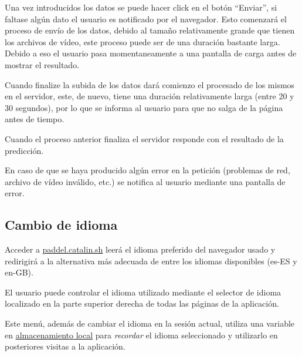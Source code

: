 
Una vez introducidos los datos se puede hacer click en el botón ``Enviar'', si
faltase algún dato el usuario es notificado por el navegador. Esto comenzará el
proceso de envío de los datos, debido al tamaño relativamente grande que tienen
los archivos de vídeo, este proceso puede ser de una duración bastante larga.
Debido a eso el usuario pasa momentaneamente a una pantalla de carga antes de
mostrar el resultado.


Cuando finalize la subida de los datos dará comienzo el procesado de los mismos
en el servidor, este, de nuevo, tiene una duración relativamente larga (entre 20
y 30 segundos), por lo que se informa al usuario para que no salga de la página
antes de tiempo.


Cuando el proceso anterior finaliza el servidor responde con el resultado de la
predicción.


En caso de que se haya producido algún error en la petición (problemas de red,
archivo de vídeo inválido, etc.) se notifica al usuario mediante una pantalla de
error.


\subsection{Cambio de idioma}

Acceder a \href{https://paddle.catalin.sh}{paddel.catalin.sh} leerá el idioma
preferido del navegador usado y redirigirá a la alternativa más adecuada de
entre los idiomas disponibles (es-ES y en-GB).

El usuario puede controlar el idioma utilizado mediante el selector de idioma
localizado en la parte superior derecha de todas las páginas de la aplicación.


Este menú, además de cambiar el idioma en la sesión actual, utiliza una variable
en
\href{https://developer.mozilla.org/es/docs/Web/API/Window/localStorage}{almacenamiento
local} para \textit{recordar} el idioma seleccionado y utilizarlo en posteriores
visitas a la aplicación.

